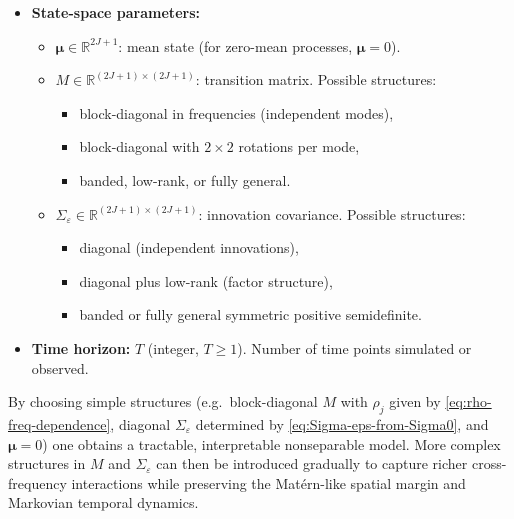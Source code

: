 \documentclass[answers,12pt,addpoints]{exam}
\begin{document}
\begin{itemize}
  \item \textbf{State-space parameters:}
    \begin{itemize}
      \item $\boldsymbol{\mu} \in \mathbb{R}^{2J+1}$: mean state (for zero-mean processes, $\boldsymbol{\mu} = 0$).
      \item $M \in \mathbb{R}^{(2J+1)\times(2J+1)}$: transition matrix. Possible structures:
        \begin{itemize}
          \item block-diagonal in frequencies (independent modes),
          \item block-diagonal with $2\times 2$ rotations per mode,
          \item banded, low-rank, or fully general.
        \end{itemize}
      \item $\Sigma_\varepsilon \in \mathbb{R}^{(2J+1)\times(2J+1)}$: innovation covariance. Possible structures:
        \begin{itemize}
          \item diagonal (independent innovations),
          \item diagonal plus low-rank (factor structure),
          \item banded or fully general symmetric positive semidefinite.
        \end{itemize}
    \end{itemize}

  \item \textbf{Time horizon:} $T$ (integer, $T\ge 1$). Number of time points simulated or observed.

\end{itemize}

By choosing simple structures (e.g.\ block-diagonal $M$ with $\rho_j$ given by \eqref{eq:rho-freq-dependence}, diagonal $\Sigma_\varepsilon$ determined by \eqref{eq:Sigma-eps-from-Sigma0}, and $\boldsymbol{\mu}=0$) one obtains a tractable, interpretable nonseparable model. More complex structures in $M$ and $\Sigma_\varepsilon$ can then be introduced gradually to capture richer cross-frequency interactions while preserving the Matérn-like spatial margin and Markovian temporal dynamics.
\end{document}
